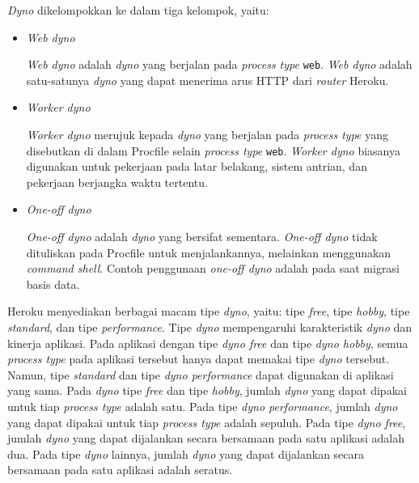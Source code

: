 \textit{Dyno} dikelompokkan ke dalam tiga kelompok, yaitu:
\begin{itemize}
\item \textit{Web dyno}

\textit{Web dyno} adalah \textit{dyno} yang berjalan pada \textit{process type} \texttt{web}. \textit{Web dyno} adalah satu-satunya \textit{dyno} yang dapat menerima arus HTTP dari \textit{router} Heroku.

\item \textit{Worker dyno}

\textit{Worker dyno} merujuk kepada \textit{dyno} yang berjalan pada \textit{process type} yang disebutkan di dalam Procfile selain \textit{process type} \texttt{web}. \textit{Worker dyno} biasanya digunakan untuk pekerjaan pada latar belakang, sistem antrian, dan pekerjaan berjangka waktu tertentu.

\item \textit{One-off dyno}

\textit{One-off dyno} adalah \textit{dyno} yang bersifat sementara. \textit{One-off dyno} tidak dituliskan pada Procfile untuk menjalankannya, melainkan menggunakan \textit{command shell}. Contoh penggunaan \textit{one-off dyno} adalah pada saat migrasi basis data.

\end{itemize} 

Heroku menyediakan berbagai macam tipe \textit{dyno}, yaitu: tipe \textit{free}, tipe \textit{hobby}, tipe \textit{standard}, dan tipe \textit{performance}. Tipe \textit{dyno} mempengaruhi karakteristik \textit{dyno} dan kinerja aplikasi. Pada aplikasi dengan tipe \textit{dyno free} dan tipe \textit{dyno hobby}, semua \textit{process type} pada aplikasi tersebut hanya dapat memakai tipe \textit{dyno} tersebut. Namun, tipe \textit{standard} dan tipe \textit{dyno performance} dapat digunakan di aplikasi yang sama. Pada \textit{dyno} tipe \textit{free} dan tipe \textit{hobby}, jumlah \textit{dyno} yang dapat dipakai untuk tiap \textit{process type} adalah satu. Pada tipe \textit{dyno performance}, jumlah \textit{dyno} yang dapat dipakai untuk tiap \textit{process type} adalah sepuluh. Pada tipe \textit{dyno free}, jumlah \textit{dyno} yang dapat dijalankan secara bersamaan pada satu aplikasi adalah dua. Pada tipe \textit{dyno} lainnya, jumlah \textit{dyno} yang dapat dijalankan secara bersamaan pada satu aplikasi adalah seratus.

